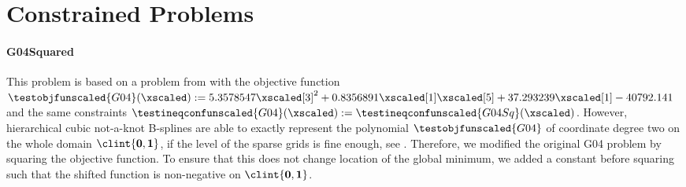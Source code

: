 \section{Constrained Problems}
\label{sec:a22constrained}

\paragraph{G04Squared}

This problem is based on a problem from
\cite{Himmelblau72Applied} with the objective function
$\testobjfunscaled{G04}(\xscaled)
:= 5.3578547 \xscaled[3]^2 + 0.8356891 \xscaled[1] \xscaled[5] +
37.293239 \xscaled[1] - 40792.141$ and the same constraints
$\testineqconfunscaled{G04}(\xscaled) :=
\testineqconfunscaled{G04Sq}(\xscaled)$.
However, hierarchical cubic not-a-knot B-splines are able to exactly
represent the polynomial $\testobjfunscaled{G04}$ of coordinate degree two
on the whole domain $\clint{\*0, \*1}$,
if the level of the sparse grids is fine enough,
see .
Therefore, we modified the original G04 problem by squaring the
objective function.
To ensure that this does not change location of the global minimum,
we added a constant before squaring such that the shifted function
is non-negative on $\clint{\*0, \*1}$.
\vspace{-1.6em}

